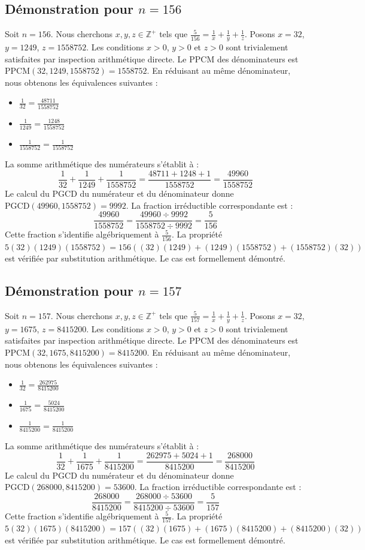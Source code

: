 \documentclass[12pt,a4paper]{article}
\begin{document}
\subsection{Démonstration pour $n = 156$}
Soit $n = 156$. Nous cherchons $x, y, z \in \mathbb{Z}^{+}$ tels que $\frac{5}{156} = \frac{1}{x} + \frac{1}{y} + \frac{1}{z}$.
Posons $x = 32$, $y = 1249$, $z = 1558752$.
Les conditions $x > 0$, $y > 0$ et $z > 0$ sont trivialement satisfaites par inspection arithmétique directe.
Le PPCM des dénominateurs est $\text{PPCM}(32, 1249, 1558752) = 1558752$.
En réduisant au même dénominateur, nous obtenons les équivalences suivantes :
\begin{itemize}
    \item $\frac{1}{32} = \frac{48711}{1558752}$
    \item $\frac{1}{1249} = \frac{1248}{1558752}$
    \item $\frac{1}{1558752} = \frac{1}{1558752}$
\end{itemize}
La somme arithmétique des numérateurs s'établit à :
$$ \frac{1}{32} + \frac{1}{1249} + \frac{1}{1558752} = \frac{48711 + 1248 + 1}{1558752} = \frac{49960}{1558752} $$
Le calcul du PGCD du numérateur et du dénominateur donne $\text{PGCD}(49960, 1558752) = 9992$.
La fraction irréductible correspondante est :
$$ \frac{49960}{1558752} = \frac{49960 \div 9992}{1558752 \div 9992} = \frac{5}{156} $$
Cette fraction s'identifie algébriquement à $\frac{5}{156}$.
La propriété $5(32)(1249)(1558752) = 156((32)(1249) + (1249)(1558752) + (1558752)(32))$ est vérifiée par substitution arithmétique.
Le cas est formellement démontré.

\subsection{Démonstration pour $n = 157$}
Soit $n = 157$. Nous cherchons $x, y, z \in \mathbb{Z}^{+}$ tels que $\frac{5}{157} = \frac{1}{x} + \frac{1}{y} + \frac{1}{z}$.
Posons $x = 32$, $y = 1675$, $z = 8415200$.
Les conditions $x > 0$, $y > 0$ et $z > 0$ sont trivialement satisfaites par inspection arithmétique directe.
Le PPCM des dénominateurs est $\text{PPCM}(32, 1675, 8415200) = 8415200$.
En réduisant au même dénominateur, nous obtenons les équivalences suivantes :
\begin{itemize}
    \item $\frac{1}{32} = \frac{262975}{8415200}$
    \item $\frac{1}{1675} = \frac{5024}{8415200}$
    \item $\frac{1}{8415200} = \frac{1}{8415200}$
\end{itemize}
La somme arithmétique des numérateurs s'établit à :
$$ \frac{1}{32} + \frac{1}{1675} + \frac{1}{8415200} = \frac{262975 + 5024 + 1}{8415200} = \frac{268000}{8415200} $$
Le calcul du PGCD du numérateur et du dénominateur donne $\text{PGCD}(268000, 8415200) = 53600$.
La fraction irréductible correspondante est :
$$ \frac{268000}{8415200} = \frac{268000 \div 53600}{8415200 \div 53600} = \frac{5}{157} $$
Cette fraction s'identifie algébriquement à $\frac{5}{157}$.
La propriété $5(32)(1675)(8415200) = 157((32)(1675) + (1675)(8415200) + (8415200)(32))$ est vérifiée par substitution arithmétique.
Le cas est formellement démontré.
\end{document}
